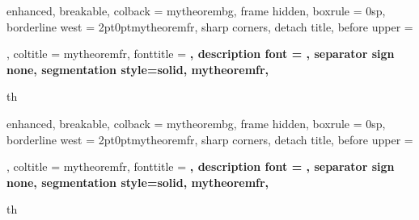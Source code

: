 
\setlength{\parindent}{1cm}

{%
	enhanced,
	breakable,
	colback = mytheorembg,
	frame hidden,
	boxrule = 0sp,
	borderline west = {2pt}{0pt}{mytheoremfr},
	sharp corners,
	detach title,
	before upper = \tcbtitle\par\smallskip,
	coltitle = mytheoremfr,
	fonttitle = \bfseries\sffamily,
	description font = \mdseries,
	separator sign none,
	segmentation style={solid, mytheoremfr},
}
{th}

{%
	enhanced,
	breakable,
	colback = mytheorembg,
	frame hidden,
	boxrule = 0sp,
	borderline west = {2pt}{0pt}{mytheoremfr},
	sharp corners,
	detach title,
	before upper = \tcbtitle\par\smallskip,
	coltitle = mytheoremfr,
	fonttitle = \bfseries\sffamily,
	description font = \mdseries,
	separator sign none,
	segmentation style={solid, mytheoremfr},
}
{th}



